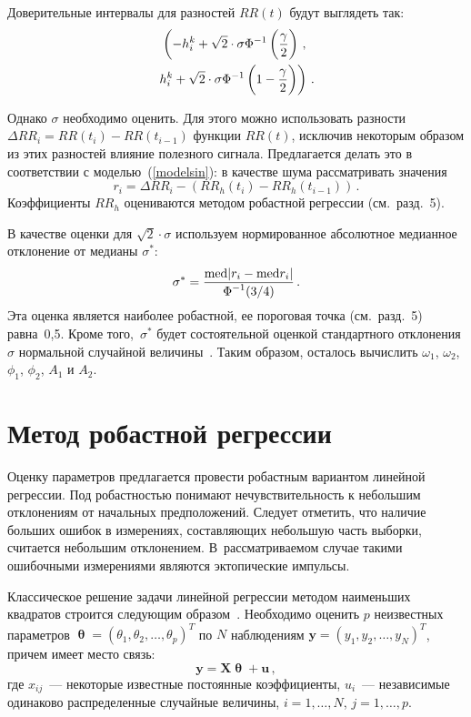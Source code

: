 \begin{multicols}{2}
Доверительные интервалы для разностей $RR(t)$ будут выглядеть так:
\begin{multline}
\label{confint}
\left( - h_i^k + \sqrt{2}\cdot\sigma\Phi^{-1}\left(\displaystyle\frac{\displaystyle \gamma\mathstrut}{\displaystyle 2\mathstrut}\right)\,,\right.\\
\left. h_i^k + \sqrt{2}\cdot\sigma\Phi^{-1}\left(1-\displaystyle\frac{\displaystyle \gamma\mathstrut}{\displaystyle 2\mathstrut}\right) \right)\,.
\end{multline}

Однако $\sigma$ необходимо оценить. Для этого можно использовать разности 
$\Delta RR_i=RR(t_i)-RR(t_{i-1})$ функции $RR(t)$, исключив некоторым образом 
из этих разностей влияние полезного сигнала. Предлагается делать это в соответствии 
с моделью~(\ref{modelsin}): в качестве шума рассматривать значения
\begin{equation*}
r_i = \Delta RR_i - \left(RR_h(t_i)-RR_h(t_{i-1})\right)\,.
\end{equation*}
Коэффициенты $RR_h$ оцениваются методом робастной регрессии (см.\ разд.~5).

В качестве оценки для $\sqrt{2}\cdot\sigma$ используем нормированное
абсолютное медианное отклонение от медианы $\sigma^*$:
\begin{equation*}
\sigma^* = \displaystyle\frac{\displaystyle \textrm{med}|r_i-\textrm{med}
r_i|\mathstrut}{\displaystyle \Phi^{-1}(3/4)\mathstrut}\,.
\end{equation*}
Эта оценка является наиболее
робастной, ее пороговая точка (см.\ разд.~5) равна~0,5. Кроме того,~$\sigma^*$ 
будет состоятельной оценкой стандартного отклонения
$\sigma$ нормальной случайной величины~\cite{5ma}. Таким образом,
осталось вычислить $\omega_1$, $\omega_2$, $\phi_1$, $\phi_2$,
$A_1$ и $A_2$.

\section{Метод робастной регрессии \label{sect_robustregr} } %

Оценку параметров предлагается провести робастным вариантом
линейной регрессии. Под робастностью понимают нечувствительность к\linebreak
небольшим отклонениям от начальных предположений. Следует
отметить, что наличие больших ошибок в измерениях, составляющих
небольшую часть выборки, считается небольшим отклонением. 
В~рассматриваемом случае такими ошибочными измерениями являются
эктопические импульсы.

Классическое решение задачи линейной регрессии методом наименьших
квадратов строится следующим образом~\cite{5ma}. Необходимо оценить $p$
неизвестных параметров
$\bm{\uptheta}=(\theta_1,\theta_2,\ldots,\theta_p)^T$ по $N$
наблюдениям $\mathbf{y}=(y_1,y_2,\ldots,y_N)^T$, причем имеет
место связь:
\begin{equation*}
\mathbf{y = X\bm{\uptheta}+u}\,,
\end{equation*}
где $x_{ij}$~--- некоторые
известные постоянные коэффициенты, $u_i$~--- независимые одинаково
распределенные случайные величины, $i=1,\ldots,N$, $j=1,\ldots,p$.


\end{multicols}
